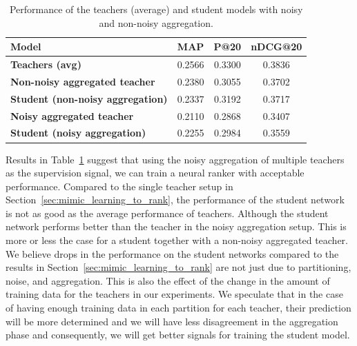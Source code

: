 \begin{table}[t]
\centering
\caption{\label{tbl_res2}Performance of the teachers (average) and student models with noisy and non-noisy aggregation.}
\vspace{5pt}
\begin{adjustbox}{max width=\textwidth}
\begin{tabular}{l c c c}
\toprule
 \textbf{Model} & \textbf{MAP} & \textbf{P@20} & \textbf{nDCG@20} 
\\ \midrule
{\textbf{Teachers (avg)}}
& 0.2566 & 0.3300 & 0.3836
\\ \midrule
\textbf{Non-noisy aggregated teacher} 
& 0.2380 & 0.3055 & 0.3702 
\\
\textbf{Student \small{(non-noisy aggregation)}} 
& 0.2337 & 0.3192 & 0.3717
\\ \midrule 
\textbf{Noisy aggregated teacher} 
& 0.2110 & 0.2868 & 0.3407 
\\
\textbf{Student \small{(noisy aggregation)}} 
& 0.2255 & 0.2984 & 0.3559 
\\ \bottomrule
\end{tabular}
\end{adjustbox}
\end{table}

Results in Table~\ref{tbl_res2} suggest that using the noisy aggregation of multiple teachers as the supervision signal, we can train a neural ranker with acceptable performance.
%
Compared to the single teacher setup in Section~\ref{sec:mimic_learning_to_rank}, the performance of the student network is not as good as the average performance of teachers. Although the student network performs better than the teacher in the noisy aggregation setup. This is more or less the case for a student together with a non-noisy aggregated teacher.
% 
We believe drops in the performance on the student networks compared to the results in Section~\ref{sec:mimic_learning_to_rank} are not just due to partitioning, noise, and aggregation. This is also the effect of the change in the amount of training data for the teachers in our experiments. We speculate that in the case of having enough training data in each partition for each teacher, their prediction will be more determined and we will have less disagreement in the aggregation phase and consequently, we will get better signals for training the student model.